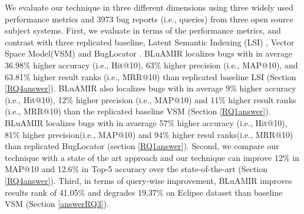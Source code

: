 \documentclass[conference]{IEEEtran}
\begin{document}
We evaluate our technique in three different dimensions using
three widely used performance metrics and 3973 bug reports (i.e.,
queries) from three open source subject systems. 
First, we evaluate in terms of the performance metrics, and contrast with three replicated baseline, Latent Semantic Indexing (LSI) \cite{MarcusLSI}, Vector Space Model(VSM) and BugLocator \cite{Jian}.
BLuAMIR localizes bugs with in average 36.98\% higher accuracy (i.e., Hit@10), 63\% higher precision (i.e., MAP@10), and 63.81\% higher result ranks (i.e., MRR@10) than replicated baseline LSI (Section \ref{RQ4answer}).
BLuAMIR also localizes bugs with in average 9\% higher accuracy (i.e.,
Hit@10), 12\% higher precision (i.e., MAP@10) and 11\%
higher result ranks (i.e., MRR@10) than the replicated baseline VSM (Section \ref{RQ1answer}).
BLuAMIR localizes bugs with in avaerage 57\% higher accuracy (i.e., Hit@10), 81\% higher precision(i.e., MAP@10) and 94\% higher resul ranks(i.e., MRR@10) than replicated BugLocator \cite{Jian} (section \ref{RQ1answer}).
Second, we compare our technique with a state of the art approach \cite{Jian}
and our technique can improve 12\% in MAP@10
and 12.6\% in Top-5 accuracy over the state-of-the-art (Section \ref{RQ4answer}).
Third, in terms of query-wise improvement, BLuAMIR improves results rank of 41.05\% and degrades 19.37\% on Eclipse dataset than baseline VSM (Section \ref{answerRQ3}).
\end{document}
